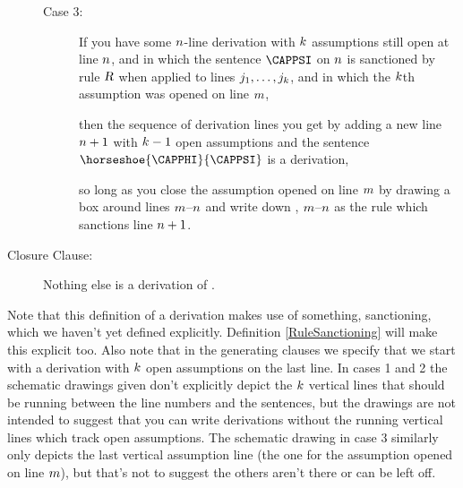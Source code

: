 \begin{majorILnc}{}
\begin{description}
\begin{description}
\item[Case 3:] If you have some $n$-line derivation with $k$ assumptions still open at line $n$, and in which the sentence $\CAPPSI$ on $n$ is sanctioned by rule $\textsl{R}$ when applied to lines $j_1,\ldots,j_k$, and in which the $k$th assumption was opened on line $m$, 
\begin{gproofnn}
\glinend{}{}{}
\glinend{}{$\qquad\vdots$}{}
\glinend{}{}{}
\galineNCnd{}{}{}
\galineNCnd{}{$\qquad\vdots$}{}
\galineNCnd{}{}{}
\end{gproofnn}
then the sequence of derivation lines you get by adding a new line $n+1$ with $k-1$ open assumptions and the sentence $\horseshoe{\CAPPHI}{\CAPPSI}$ is a derivation,
\begin{gproofnn}
\glinend{}{}{}
\glinend{}{$\qquad\vdots$}{}
\glinend{}{}{}
\end{gproofnn}
so long as you close the assumption opened on line $m$ by drawing a box around lines $m$--$n$ and write down , $m$--$n$ as the rule which sanctions line $n+1$. 
\end{description}

\item[Closure Clause:] Nothing else is a derivation of \GSL{}.
\end{description}
\end{majorILnc}
\noindent{}Note that this definition of a derivation makes use of something, sanctioning, which we haven't yet defined explicitly. 
Definition \ref{RuleSanctioning} will make this explicit too. 
Also note that in the generating clauses we specify that we start with a derivation with $k$ open assumptions on the last line. 
In cases 1 and 2 the schematic drawings given don't explicitly depict the $k$ vertical lines that should be running between the line numbers and the sentences, but the drawings are not intended to suggest that you can write derivations without the running vertical lines which track open assumptions. 
The schematic drawing in case 3 similarly only depicts the last vertical assumption line (the one for the assumption opened on line $m$), but that's not to suggest the others aren't there or can be left off.   

